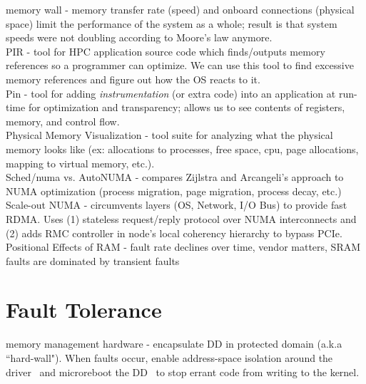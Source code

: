 \documentclass{article}
\begin{document}
\noindent\cite{wulf:sigarch1995-memory-wall} memory wall - memory transfer rate (speed) and onboard connections (physical space) limit the performance of the system as a whole; result is that system speeds were not doubling according to Moore's law anymore.\\

\noindent\cite{olschanowsky:ICPPW2010-PIR} PIR - tool for HPC application source code which finds/outputs memory references so a programmer can optimize. We can use this tool to find excessive memory references and figure out how the OS reacts to it. \\

\noindent\cite{luk:PLDI2005-pin} Pin - tool for adding \emph{instrumentation} (or extra code) into an application at run-time for optimization and transparency; allows us to see contents of registers, memory, and control flow.\\

\noindent\cite{movall:atec2005-physical} Physical Memory Visualization - tool suite for analyzing what the physical memory looks like (ex: allocations to processes, free space, cpu, page allocations, mapping to virtual memory, etc.).\\

\noindent\cite{corbet:LWNnet2012-NUMA} Sched/numa vs. AutoNUMA - compares Zijlstra and Arcangeli's approach to NUMA optimization (process migration, page migration, process decay, etc.)\\

\noindent\cite{novakovic:asplos2014-soNUMA} Scale-out NUMA - circumvents layers (OS, Network, I/O Bus) to provide fast RDMA. Uses (1) stateless request/reply protocol over NUMA interconnects and (2) adds RMC controller in node's local coherency hierarchy to bypass PCIe. \\

\noindent\cite{} Positional Effects of RAM - fault rate declines over time, vendor matters, SRAM faults are dominated by transient faults

\section{Fault Tolerance}
\noindent\cite{swift:sosp2003-nook, swift:osdi2004-shadow-drivers} memory management hardware - encapsulate DD in protected domain (a.k.a ``hard-wall"). When faults occur, enable address-space isolation around the driver~\cite{swift:sosp2003-nook} and microreboot the DD~\cite{swift:osdi2004-shadow-drivers} to stop errant code from writing to the kernel. \\
\end{document}
